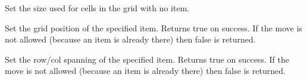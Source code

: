 \label{wxgridbagsizersetemptycellsize}


Set the size used for cells in the grid with no item.



\label{wxgridbagsizersetitemposition}




Set the grid position of the specified item.  Returns true on success.
If the move is not allowed (because an item is already there) then
false is returned.  



\label{wxgridbagsizersetitemspan}




Set the row/col spanning of the specified item. Returns true on
success.  If the move is not allowed (because an item is already there)
then false is returned.



